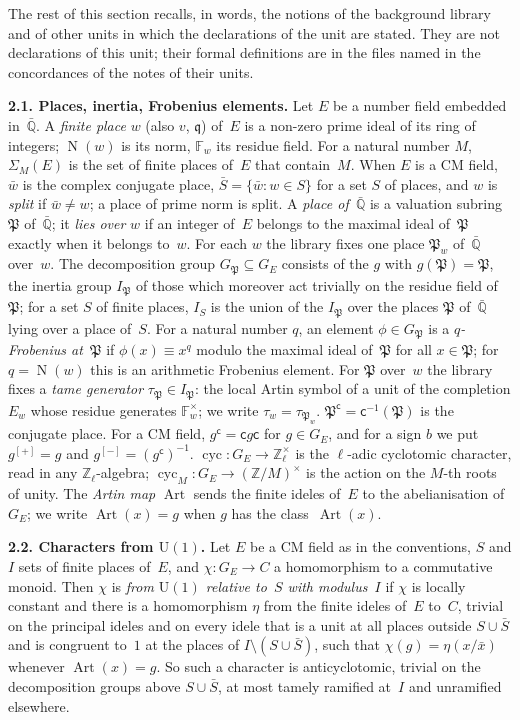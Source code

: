 \documentclass[11pt,a4paper]{article}
\newcommand{\F}{\mathbb{F}}
\newcommand{\m}[1]{\mbox{$#1$}}        %
\newcommand{\subhead}[1]{\par\addvspace{9pt plus 2pt}\Needspace{4\baselineskip}\noindent\textbf{#1}\enspace\ignorespaces}
\theoremstyle{plainx}
\theoremstyle{uprightx}
\newcommand{\Qb}{\bar{\mathbb{Q}}}
\newcommand{\Zl}{\mathbb{Z}_\ell}
\newcommand{\GE}[1]{G_{#1}}
\newcommand{\cyc}{\operatorname{cyc}}
\newcommand{\pd}[2]{\Sigma_{#2}(#1)}
\newcommand{\inab}[1]{I_{#1}}
\newcommand{\cj}[1]{\bar{#1}}
\newcommand{\Nm}{\operatorname{N}}
\newcommand{\fP}{\mathfrak{P}}
\newcommand{\fq}{\mathfrak{q}}
\newcommand{\Art}{\operatorname{Art}}
\begin{document}
The rest of this section recalls, in words, the notions of the background library and of other units in which
the declarations of the unit are stated. They are not declarations of this unit; their formal definitions are in
the files named in the concordances of the notes of their units.

\subhead{2.1. Places, inertia, Frobenius elements.} Let $E$ be a number field embedded in~\m{\Qb}. A
\emph{finite place} $w$ (also $v$, $\fq$) of~$E$ is a non-zero prime ideal of its ring of integers; \m{\Nm(w)}
is its norm, $\F_w$ its residue field. For a natural number $M$, \m{\pd{E}{M}} is the set of finite places
of~$E$ that contain~$M$. When $E$ is a CM field, \m{\cj{w}} is the complex conjugate place, \m{\cj{S}=\{\cj{w}:w\in S\}}
for a set $S$ of places, and $w$ is \emph{split} if \m{\cj{w}\ne w}; a place of prime norm is split. A \emph{place of~\m{\Qb}} is a valuation subring $\fP$ of~\m{\Qb}; it \emph{lies over}
$w$ if an integer of~$E$ belongs to the maximal ideal of~$\fP$ exactly when it belongs to~$w$. For each $w$ the
library fixes one place \m{\fP_w} of~\m{\Qb} over~$w$. The decomposition group \m{G_{\fP}\subseteq\GE{E}}
consists of the $g$ with \m{g(\fP)=\fP}, the inertia group \m{I_{\fP}} of those which moreover act trivially on
the residue field of~$\fP$; for a set $S$ of finite places, \m{\inab{S}} is the union of the \m{I_{\fP}} over
the places $\fP$ of~\m{\Qb} lying over a place of~$S$. For a natural number $q$, an element \m{\phi\in G_{\fP}} is a
\emph{$q$-Frobenius at~$\fP$} if \m{\phi(x)\equiv x^{q}} modulo the maximal ideal of~$\fP$ for all \m{x\in\fP};
for \m{q=\Nm(w)} this is an arithmetic Frobenius element. For $\fP$ over~$w$ the library fixes a
\emph{tame generator} \m{\tau_{\fP}\in I_{\fP}}: the local Artin symbol of a unit of the completion $E_w$ whose
residue generates \m{\F_w^{\times}}; we write \m{\tau_w=\tau_{\fP_w}}. \m{\fP^{\mathsf c}=\mathsf{c}^{-1}(\fP)} is the conjugate place. For
a CM field, \m{g^{\mathsf c}=\mathsf{c}g\mathsf{c}} for \m{g\in\GE{E}}, and for a sign $b$ we put
\m{g^{[+]}=g} and \m{g^{[-]}=(g^{\mathsf c})^{-1}}. \m{\cyc\colon\GE{E}\to\Zl^{\times}} is the $\ell$-adic
cyclotomic character, read in any \m{\Zl}-algebra; \m{\cyc_M\colon\GE{E}\to(\mathbb{Z}/M)^{\times}} is the action
on the $M$-th roots of unity. The \emph{Artin map} \m{\Art} sends the finite ideles of~$E$ to the abelianisation of~\m{\GE{E}}; we write
\m{\Art(x)=g} when $g$ has the class~\m{\Art(x)}.

\subhead{2.2. Characters from $\mathrm{U}(1)$.} Let $E$ be a CM field as in the conventions, $S$ and $I$ sets of
finite places of~$E$, and \m{\chi\colon\GE{E}\to C} a homomorphism to a commutative monoid. Then $\chi$ is
\emph{from $\mathrm{U}(1)$ relative to~$S$ with modulus~$I$} if $\chi$ is locally constant and there is a
homomorphism $\eta$ from the finite ideles of~$E$ to~$C$, trivial on the principal ideles and on every idele
that is a unit at all places outside \m{S\cup\cj{S}} and is congruent to~$1$ at the places of
\m{I\setminus(S\cup\cj{S})}, such that \m{\chi(g)=\eta(x/\cj{x})} whenever \m{\Art(x)=g}. So such a character is
anticyclotomic, trivial on the decomposition groups above \m{S\cup\cj{S}}, at most tamely ramified at~$I$ and
unramified elsewhere.
\end{document}
